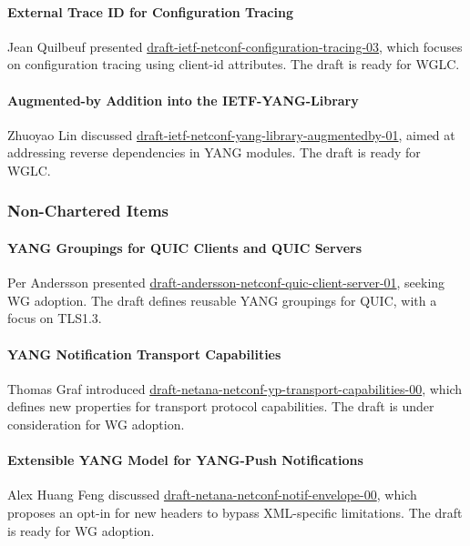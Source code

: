 \documentclass{article}
\begin{document}
\paragraph{External Trace ID for Configuration Tracing}
Jean Quilbeuf presented \href{https://datatracker.ietf.org/doc/html/draft-ietf-netconf-configuration-tracing-03}{draft-ietf-netconf-configuration-tracing-03}, which focuses on configuration tracing using client-id attributes. The draft is ready for WGLC.

\paragraph{Augmented-by Addition into the IETF-YANG-Library}
Zhuoyao Lin discussed \href{https://datatracker.ietf.org/doc/html/draft-ietf-netconf-yang-library-augmentedby-01}{draft-ietf-netconf-yang-library-augmentedby-01}, aimed at addressing reverse dependencies in YANG modules. The draft is ready for WGLC.

\subsubsection{Non-Chartered Items}
\paragraph{YANG Groupings for QUIC Clients and QUIC Servers}
Per Andersson presented \href{https://datatracker.ietf.org/doc/html/draft-andersson-netconf-quic-client-server-01}{draft-andersson-netconf-quic-client-server-01}, seeking WG adoption. The draft defines reusable YANG groupings for QUIC, with a focus on TLS1.3.

\paragraph{YANG Notification Transport Capabilities}
Thomas Graf introduced \href{https://datatracker.ietf.org/doc/html/draft-netana-netconf-yp-transport-capabilities-00}{draft-netana-netconf-yp-transport-capabilities-00}, which defines new properties for transport protocol capabilities. The draft is under consideration for WG adoption.

\paragraph{Extensible YANG Model for YANG-Push Notifications}
Alex Huang Feng discussed \href{https://datatracker.ietf.org/doc/html/draft-netana-netconf-notif-envelope-00}{draft-netana-netconf-notif-envelope-00}, which proposes an opt-in for new headers to bypass XML-specific limitations. The draft is ready for WG adoption.
\end{document}
